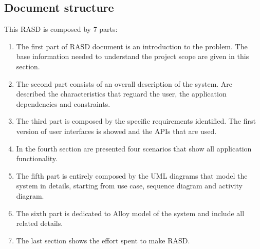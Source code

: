 \subsection{Document structure}
This RASD is composed by 7 parts:
\begin{enumerate}
	\item The first part of RASD document is an introduction to the problem. The base information needed to understand the project scope are given in this section.
	\item The second part consists of an overall description of the system. Are described the characteristics that reguard the user, the application dependencies and constraints.
	\item The third part is composed by the specific requirements identified. The first version of user interfaces is showed and the APIs that are used.
	\item In the fourth section are presented four scenarios that show all application functionality.
	\item The fifth part is entirely composed by the UML diagrams that model the system in details, starting from use case, sequence diagram and activity diagram.
	\item The sixth part is dedicated to Alloy model of the system and include all related details.
	\item The last section shows the effort spent to make RASD.
\end{enumerate}
